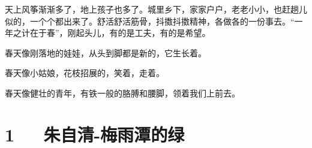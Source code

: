 \documentclass[letterpaper,12pt,english]{sphinxmanual}
\begin{document}
天上风筝渐渐多了，地上孩子也多了。城里乡下，家家户户，老老小小，也赶趟儿似的，一个个都出来了。舒活舒活筋骨，抖擞抖擞精神，各做各的一份事去。“一年之计在于春”，刚起头儿，有的是工夫，有的是希望。

春天像刚落地的娃娃，从头到脚都是新的，它生长着。

春天像小姑娘，花枝招展的，笑着，走着。

春天像健壮的青年，有铁一般的胳膊和腰脚，领着我们上前去。


\chapter{1   朱自清-梅雨潭的绿}
\label{\detokenize{p01_u6563_u6587/_u6731_u81ea_u6e05-_u6885_u96e8_u6f6d_u7684_u7eff:id1}}\label{\detokenize{p01_u6563_u6587/_u6731_u81ea_u6e05-_u6885_u96e8_u6f6d_u7684_u7eff::doc}}
\end{document}
